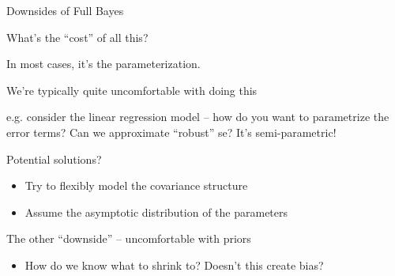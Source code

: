 \documentclass[notes,11pt, aspectratio=169]{beamer}
\newenvironment{wideitemize}{\itemize\addtolength{\itemsep}{10pt}}{\enditemize}
\begin{document}
\begin{frame}{Downsides of Full Bayes}
  \begin{wideitemize}
  \item  What's the ``cost'' of all this?
  \item  In most cases, it's the parameterization.
  \item  We're typically quite uncomfortable with doing this
  \item e.g. consider the linear regression model -- how do you want
    to parametrize the error terms? Can we approximate ``robust'' se?
    It's semi-parametric!
  \item Potential solutions?
    \begin{itemize}
    \item Try to flexibly model the covariance structure
    \item Assume the asymptotic distribution of the parameters
    \end{itemize}
  \item The other ``downside'' -- uncomfortable with priors
    \begin{itemize}
    \item How do we know what to shrink to? Doesn't this create bias?
    \end{itemize}
  \end{wideitemize}
\end{frame}
\end{document}
